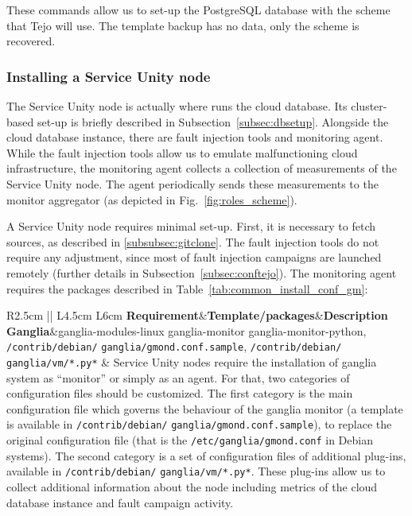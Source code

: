 These commands allow us to set-up the PostgreSQL database with the scheme that Tejo will use. The template backup has no data, only the scheme is recovered.


\subsubsection{Installing a Service Unity node}
\label{subsubsec:su}

The Service Unity node is actually where runs the cloud database. Its cluster-based set-up is briefly described in Subsection~\ref{subsec:dbsetup}. Alongside the cloud database instance, there are fault injection tools and monitoring agent. While the fault injection tools allow us to emulate malfunctioning cloud infrastructure, the monitoring agent collects a collection of measurements of the Service Unity node. The agent periodically sends these measurements to the monitor aggregator (as depicted in Fig.~\ref{fig:roles_scheme}). 

A Service Unity node requires minimal set-up. First, it is necessary to fetch sources, as described in \ref{subsubsec:gitclone}. The fault injection tools do not require any adjustment, since most of fault injection campaigns are launched remotely (further details in Subsection~\ref{subsec:conftejo}). The monitoring agent requires the packages described in Table~\ref{tab:common_install_conf_gm}:

			\begin{table}[htdp]
				\begin{center}
\caption{Required packages and configuration file adjustments for a Service Unity node.}
  \label{tab:common_install_conf_gm}
					\begin{tabular}{R{2.5cm} || L{4.5cm} L{6cm} }
						{\bf Requirement}&{\bf Template/packages}&{\bf Description} \\  
						\hline
						\hline
						{\bf Ganglia}&ganglia-modules-linux ganglia-monitor ganglia-monitor-python, \verb|/contrib/debian/| \verb|ganglia/gmond.conf.sample|, \verb|/contrib/debian/| \verb|ganglia/vm/*.py*| & Service Unity nodes require the installation of ganglia system as ``monitor'' or simply as an agent. For that, two categories of configuration files should be customized. The first category is the main configuration file which governs the behaviour of the ganglia monitor (a template is available in \verb|/contrib/debian/| \verb|ganglia/gmond.conf.sample|), to replace the original configuration file (that is the \verb|/etc/ganglia/gmond.conf| in Debian systems). The second category is a set of configuration files of additional plug-ins, available in \verb|/contrib/debian/| \verb|ganglia/vm/*.py*|. These plug-ins allow us to collect additional information about the node including metrics of the cloud database instance and fault campaign activity.\\
					\end{tabular}
				\end{center}
			\end{table}


